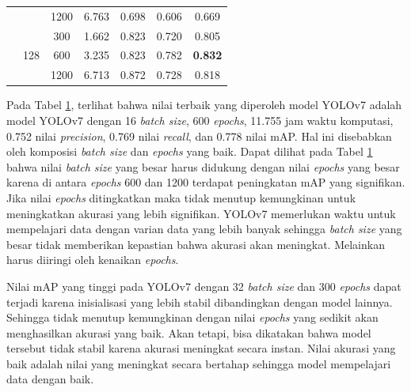 \begin{table}[H]
\begin{tabular}{|c|c|c|c|c|c|c|}
                                     &                      & 1200            & 6.763              & 0.698 & 0.606 & 0.669\\ \cline{2-7}
                                     & \multirow{3}{*}{128} & 300             & 1.662              & 0.823 & 0.720 & 0.805\\ \cline{3-7}
                                     &                      & 600             & 3.235              & 0.823 & 0.782 & \textbf{0.832}\\ \cline{3-7}
                                     &                      & 1200            & 6.713              & 0.872 & 0.728 & 0.818\\ \cline{2-7}
        \hline
    \end{tabular}
    \label{tab:d-testing}
\end{table}

Pada Tabel \ref{tab:d-testing}, terlihat bahwa nilai terbaik yang diperoleh model YOLOv7 adalah model YOLOv7 dengan 16 \textit{batch size}, 600 \textit{epochs}, 11.755 jam waktu komputasi, 0.752 nilai \textit{precision}, 0.769 nilai \textit{recall}, dan 0.778 nilai mAP. Hal ini disebabkan oleh komposisi \textit{batch size} dan \textit{epochs} yang baik. Dapat dilihat pada Tabel \ref{tab:d-testing} bahwa nilai \textit{batch size} yang besar harus didukung dengan nilai \textit{epochs} yang besar karena di antara \textit{epochs} 600 dan 1200 terdapat peningkatan mAP yang signifikan. Jika nilai \textit{epochs} ditingkatkan maka tidak menutup kemungkinan untuk meningkatkan akurasi yang lebih signifikan. YOLOv7 memerlukan waktu untuk mempelajari data dengan varian data yang lebih banyak sehingga \textit{batch size} yang besar tidak memberikan kepastian bahwa akurasi akan meningkat. Melainkan harus diiringi oleh kenaikan \textit{epochs}.

Nilai mAP yang tinggi pada YOLOv7 dengan 32 \textit{batch size} dan 300 \textit{epochs} dapat terjadi karena inisialisasi yang lebih stabil dibandingkan dengan model lainnya. Sehingga tidak menutup kemungkinan dengan nilai \textit{epochs} yang sedikit akan menghasilkan akurasi yang baik. Akan tetapi, bisa dikatakan bahwa model tersebut tidak stabil karena akurasi meningkat secara instan. Nilai akurasi yang baik adalah nilai yang meningkat secara bertahap sehingga model mempelajari data dengan baik.

